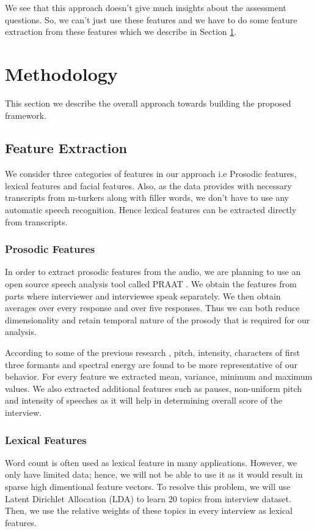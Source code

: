 \documentclass[11pt]{article}
\begin{document}
We see that this approach doesn't give much insights about the assessment questions. So, we can't just use these features and we have to do some feature extraction from these features which we describe in Section \ref{sec:methodology}.

\section{Methodology}
\label{sec:methodology}
This section we describe the overall approach towards building the proposed framework.
\subsection{Feature Extraction}
We consider three categories of features in our approach i.e Prosodic features, lexical features and facial features. Also, as the data provides with necessary transcripts from m-turkers along with filler words, we don't have to use any automatic speech recognition. Hence lexical features can be extracted directly from transcripts.
\subsubsection{Prosodic Features}
In order to extract prosodic features from the audio, we are planning to use an open source speech analysis tool called PRAAT \cite{naim2015automated}. We obtain the features from parts where interviewer and interviewee speak separately. We then obtain averages over every response and over five responses. Thus we can both reduce dimensionality and retain temporal nature of the prosody that is required for our analysis.

According to some of the previous research \cite{frick1985communicating}, pitch, intensity, characters of first three formants and spectral energy are found to be more representative of our behavior. For every feature we extracted mean, variance, minimum and maximum values. We also extracted additional features such as pauses, non-uniform pitch and intensity of speeches as it will help in determining overall score of the interview.
\subsubsection{Lexical Features}
Word count is often used as lexical feature in many applications. However, we only have limited data; hence, we will not be able to use it as it would result in sparse high dimentional feature vectors. To resolve this problem, we will use Latent Dirichlet Allocation (LDA) to learn 20 topics from interview dataset. Then, we use the relative weights of these topics in every interview as lexical features.
\end{document}
